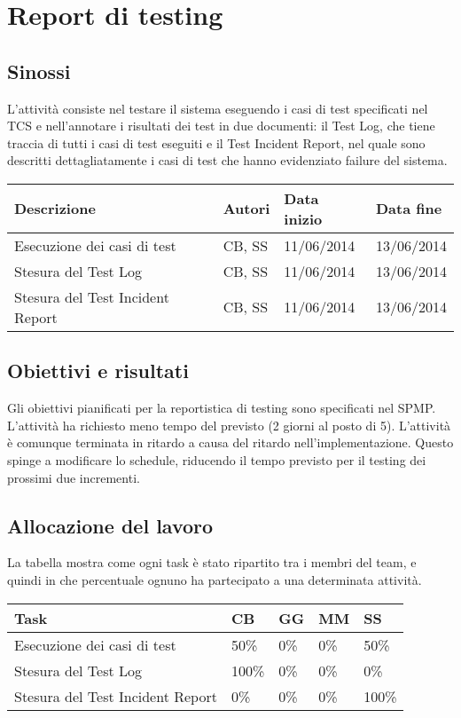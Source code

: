 \section{Report di testing}
\subsection{Sinossi}
L'attività consiste nel testare il sistema eseguendo i casi di test specificati nel TCS e nell'annotare i risultati dei test in due documenti: il Test Log, che tiene traccia di tutti i casi di test eseguiti e il Test Incident Report, nel quale sono descritti dettagliatamente i casi di test che hanno evidenziato failure del sistema.

\begin{table}[ht]
 \begin{tabular}{|p{6cm}|p{2cm}|p{2cm}|p{2cm}|}
    \hline
    \rowcolor{Gray}\textbf{Descrizione}			& \textbf{Autori}		& \textbf{Data inizio}			& \textbf{Data fine}	\\
    \hline
    Esecuzione dei casi di test				& CB, SS			& 11/06/2014				& 13/06/2014		\\
    \hline
    Stesura del Test Log				& CB, SS			& 11/06/2014				& 13/06/2014		\\
    \hline
    Stesura del Test Incident Report			& CB, SS			& 11/06/2014				& 13/06/2014		\\
    \hline
 \end{tabular}
\end{table}

\subsection{Obiettivi e risultati}
Gli obiettivi pianificati per la reportistica di testing sono specificati nel SPMP. L'attività ha richiesto meno tempo del previsto (2 giorni al posto di 5). L'attività è comunque  terminata in ritardo a causa del ritardo nell'implementazione. Questo spinge a modificare lo schedule, riducendo il tempo previsto per il testing dei prossimi due incrementi. 

\subsection{Allocazione del lavoro}
La tabella mostra come ogni task è stato ripartito tra i membri del team, e quindi in che percentuale ognuno ha partecipato a una determinata attività.
\begin{table}[ht]
 \centering
 \begin{tabular}{|p{7.5cm}|p{1cm}|p{1cm}|p{1cm}|p{1cm}|}
  \hline
  \rowcolor{Gray}\textbf{Task}			& \textbf{CB}		& \textbf{GG}		& \textbf{MM}		& \textbf{SS}		\\
  \hline
  Esecuzione dei casi di test			& 50\%			& 0\%			& 0\%			& 50\%			\\
  \hline
  Stesura del Test Log				& 100\%			& 0\%			& 0\%			& 0\%			\\
  \hline
  Stesura del Test Incident Report		& 0\%			& 0\%			& 0\%			& 100\%			\\
  \hline
 \end{tabular}
\end{table}
